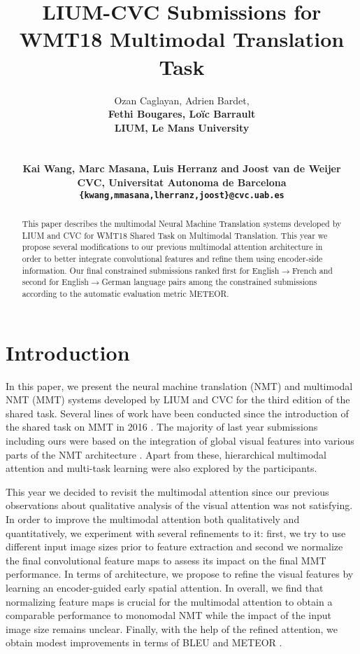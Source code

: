 \documentclass[11pt,a4paper]{article}
\title{LIUM-CVC Submissions for WMT18 Multimodal Translation Task}
\author{Ozan Caglayan, Adrien Bardet, \\
         \bf Fethi Bougares, Lo\"ic Barrault \\
         LIUM, Le Mans University \\
         \tm{FirstName.LastName@univ-lemans.fr} \\
          \\
         \bf Kai Wang, Marc Masana, Luis Herranz and Joost van de Weijer\\
    CVC, Universitat Autonoma de Barcelona\\
    {\tt \{kwang,mmasana,lherranz,joost\}@cvc.uab.es}}
\date{}
\newcommand{\ra}{$\rightarrow$}
\begin{document}
\maketitle

\begin{abstract}
This paper describes the multimodal Neural Machine Translation systems
developed by LIUM and CVC for WMT18 Shared Task on Multimodal Translation.
This year we propose several modifications to our previous multimodal attention
architecture in order to better integrate convolutional features and
refine them using encoder-side information.
Our final constrained submissions ranked first for English\ra French and second for English\ra German
language pairs among the constrained submissions according to the automatic evaluation metric METEOR.
\end{abstract}

\section{Introduction}
In this paper, we present the neural machine translation (NMT) and multimodal NMT (MMT) systems
developed by LIUM and CVC for the third edition of the shared task.
Several lines of work have been conducted since the introduction of the
shared task on MMT in 2016 \cite{specia2016shared}. The majority of last year submissions
including ours \cite{caglayan2017} were based on the integration of global visual features
into various parts of the NMT architecture \cite{findings2017}. Apart from these,
hierarchical multimodal attention \cite{helcl2017} and multi-task learning \cite{elliott2017imagination}
were also explored by the participants.

This year we decided to revisit the multimodal attention \cite{caglayan2016multiatt} since
our previous observations about qualitative analysis of the visual attention was not satisfying.
In order to improve the multimodal attention both qualitatively and quantitatively, we experiment
with several refinements to it: first, we try to use different input image sizes prior to feature extraction and
second we normalize the final convolutional feature maps to assess its impact on the final MMT performance.
In terms of architecture, we propose to refine the visual features by learning an encoder-guided early spatial attention.
In overall, we find that normalizing feature maps is crucial for the multimodal attention
to obtain a comparable performance to monomodal NMT while the impact of the input image size remains unclear.
Finally, with the help of the refined attention, we obtain modest improvements in terms of BLEU \cite{Papineni:2002:acl} and METEOR \cite{Lavie:2007:acl}.
\end{document}
